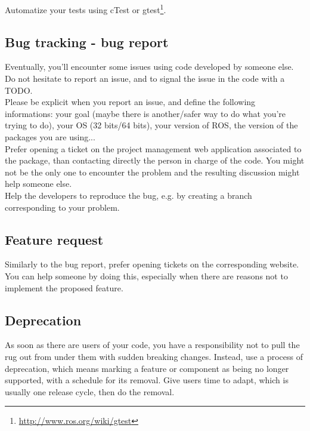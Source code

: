 Automatize your tests using cTest or gtest\footnote{\url{http://www.ros.org/wiki/gtest}}.

\subsection{Bug tracking - bug report}
Eventually, you'll encounter some issues using code developed by someone else.\\
Do not hesitate to report an issue, and to signal the issue in the code with a TODO.\\
Please be explicit when you report an issue, and define the following informations:
your goal (maybe there is another/safer way to do what you're trying to do), 
your OS (32 bits/64 bits), your version of ROS, the version of the packages you are using...\\

Prefer opening a ticket on the project management web application associated to the package, than contacting directly the person in charge of the code. 
You might not be the only one to encounter the problem and the resulting discussion might help someone else.\\

Help the developers to reproduce the bug, e.g. by creating a branch corresponding to your problem.



\subsection{Feature request}
Similarly to the bug report, prefer opening tickets on the corresponding website.
You can help someone by doing this, especially when there are reasons not to implement the proposed feature.

\subsection{Deprecation}
As soon as there are users of your code, you have a responsibility not to pull the rug out from under them with sudden breaking changes. 
Instead, use a process of deprecation, which means marking a feature or component as being no longer supported, with a schedule for its removal. Give users time to adapt, which is usually one release cycle, then do the removal.

